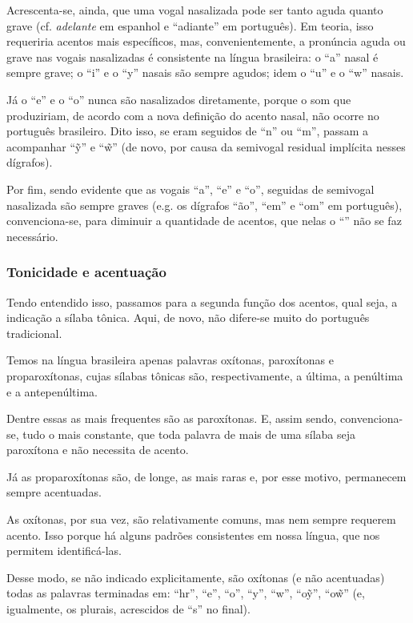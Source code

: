 \documentclass[12pt, a5paper, titlepage]{article}
\begin{document}
\begin{bilingualpages}
    Acrescenta-se, ainda, que uma vogal nasalizada pode ser tanto aguda quanto
    grave (cf. \textit{adelante} em espanhol e ``adiante'' em português). Em
    teoria, isso requeriria acentos mais específicos, mas, convenientemente, a
    pronúncia aguda ou grave nas vogais nasalizadas é consistente na língua
    brasileira: o ``a'' nasal é sempre grave; o ``i'' e o ``y'' nasais são sempre
    agudos; idem o ``u'' e o ``w'' nasais.
    
    Já o ``e'' e o ``o'' nunca são
    nasalizados diretamente, porque o som que produziriam, de acordo com a nova
    definição do acento nasal, não ocorre no português brasileiro. Dito isso, se eram seguidos de ``n'' ou ``m'', passam a acompanhar ``\~y'' e ``\~w''
    (de novo, por causa da semivogal residual implícita nesses dígrafos).

    Por fim, sendo evidente que as vogais ``a'', ``e'' e ``o'', seguidas de semivogal nasalizada são sempre graves (e.g. os dígrafos ``ão'', ``em'' e ``om'' em português), convenciona-se, para diminuir a quantidade de acentos, que nelas o ``\textasciigrave'' não se faz necessário.

    \subsubsection{Tonicidade e acentuação}
    Tendo entendido isso, passamos para a segunda função dos acentos, qual seja, a indicação a sílaba tônica. Aqui, de novo, não difere-se muito do português tradicional.

    Temos na língua brasileira apenas palavras oxítonas, paroxítonas e proparoxítonas, cujas sílabas tônicas são, respectivamente, a última, a penúltima e a antepenúltima.
    
    Dentre essas as mais frequentes são as paroxítonas. E, assim sendo, convenciona-se, tudo o mais constante, que toda palavra de mais de uma sílaba seja paroxítona e não necessita de acento.

    Já as proparoxítonas são, de longe, as mais raras e, por esse motivo, permanecem sempre acentuadas.
    
    As oxítonas, por sua vez, são relativamente comuns, mas nem sempre requerem acento. Isso porque há alguns padrões consistentes em nossa língua, que nos permitem identificá-las.
    
    Desse modo, se não indicado explicitamente, são oxítonas (e não acentuadas) todas as palavras terminadas em: ``hr'', ``e'', ``o'', ``y'', ``w'', ``o\~y'', ``o\~w'' (e, igualmente, os plurais, acrescidos de ``s'' no final).


\end{bilingualpages}
\end{document}
